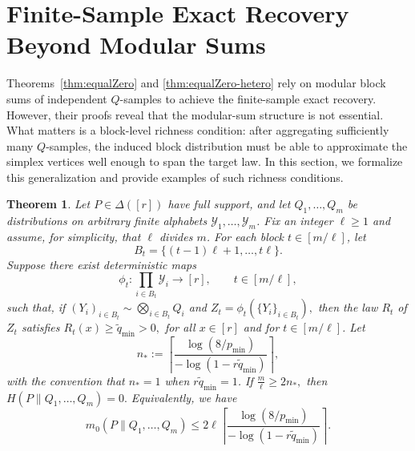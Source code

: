 \documentclass[journal]{IEEEtran}
\newtheorem{theorem}{Theorem}
\def\calY{{\mathcal Y}}
\newcommand{\1}{\mathbf{1}}
\begin{document}
\section{Finite-Sample Exact Recovery Beyond Modular Sums}\label{app:ExactRecovery}
Theorems~\ref{thm:equalZero} and \ref{thm:equalZero-hetero} rely on modular block sums of independent $Q$-samples to achieve the finite-sample exact recovery. However, their proofs reveal that the modular-sum structure is not essential. What
matters is a block-level richness condition: after aggregating sufficiently
many $Q$-samples, the induced block distribution must be able to approximate
the simplex vertices well enough to span the target law. In this section, we formalize this generalization and provide examples of such richness conditions.   
\begin{theorem}\label{thm:hetero-unified}
Let $P\in\Delta([r])$ have full support, and let $Q_1,\dots,Q_m$ be distributions on arbitrary finite alphabets $\calY_1,\dots,\calY_m$. Fix an integer $\ell\ge1$ and assume, for simplicity, that $\ell$ divides $m$. For each block $t\in[m/\ell]$, let
$$
B_t=\{(t-1)\ell+1,\dots,t\ell\}.
$$
Suppose there exist deterministic maps
$$
\phi_t:\prod_{i\in B_t}\calY_i\to [r],
\qquad t\in [m/\ell],$$
such that, if $(Y_i)_{i\in B_t}\sim\bigotimes_{i\in B_t} Q_i$ and
$Z_t=\phi_t(\{Y_i\}_{i\in B_t}),$
then the law $R_t$ of $Z_t$ satisfies
$R_t(x)\ge \widetilde q_{\min}>0,$
for all $x\in[r]$ and for $t\in [m/\ell]$. Let
$$n_*:= \left\lceil \frac{\log(8/p_{\min})}{-\log(1-r\widetilde q_{\min})} \right\rceil,$$
with the convention that $n_*=1$ when $r\widetilde q_{\min}=1$. If $\frac{m}{\ell}\ge 2n_*,$ then $H(P\|Q_1,\dots,Q_m)=0.$ Equivalently, we have 
$$ m_0(P\|Q_1,\dots,Q_m) \le 2\ell \left\lceil \frac{\log(8/p_{\min})}{-\log(1-r\widetilde q_{\min})} \right\rceil.$$
\end{theorem}
\end{document}
